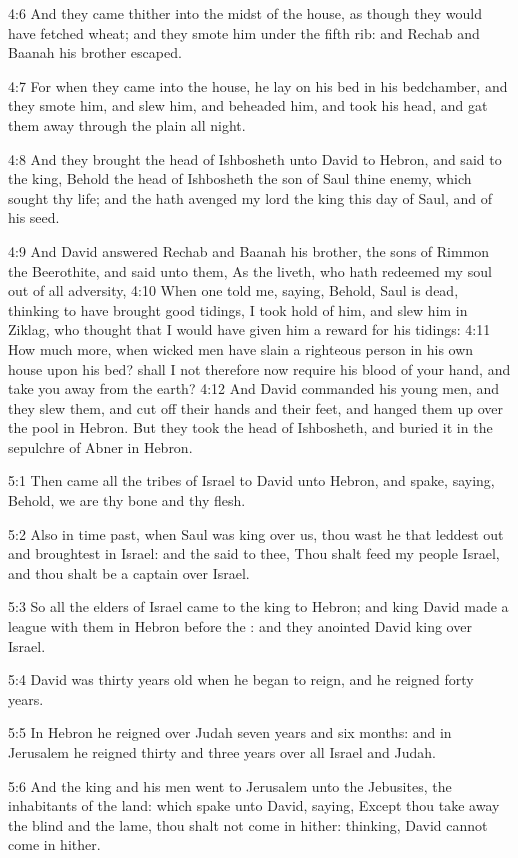 4:6 And they came thither into the midst of the house, as though they would have fetched wheat; and they smote him under the fifth rib: and Rechab and Baanah his brother escaped.

4:7 For when they came into the house, he lay on his bed in his bedchamber, and they smote him, and slew him, and beheaded him, and took his head, and gat them away through the plain all night.

4:8 And they brought the head of Ishbosheth unto David to Hebron, and said to the king, Behold the head of Ishbosheth the son of Saul thine enemy, which sought thy life; and the \LORD hath avenged my lord the king this day of Saul, and of his seed.

4:9 And David answered Rechab and Baanah his brother, the sons of Rimmon the Beerothite, and said unto them, As the \LORD liveth, who hath redeemed my soul out of all adversity, 4:10 When one told me, saying, Behold, Saul is dead, thinking to have brought good tidings, I took hold of him, and slew him in Ziklag, who thought that I would have given him a reward for his tidings: 4:11 How much more, when wicked men have slain a righteous person in his own house upon his bed? shall I not therefore now require his blood of your hand, and take you away from the earth?  4:12 And David commanded his young men, and they slew them, and cut off their hands and their feet, and hanged them up over the pool in Hebron. But they took the head of Ishbosheth, and buried it in the sepulchre of Abner in Hebron.

5:1 Then came all the tribes of Israel to David unto Hebron, and spake, saying, Behold, we are thy bone and thy flesh.

5:2 Also in time past, when Saul was king over us, thou wast he that leddest out and broughtest in Israel: and the \LORD said to thee, Thou shalt feed my people Israel, and thou shalt be a captain over Israel.

5:3 So all the elders of Israel came to the king to Hebron; and king David made a league with them in Hebron before the \LORD: and they anointed David king over Israel.

5:4 David was thirty years old when he began to reign, and he reigned forty years.

5:5 In Hebron he reigned over Judah seven years and six months: and in Jerusalem he reigned thirty and three years over all Israel and Judah.

5:6 And the king and his men went to Jerusalem unto the Jebusites, the inhabitants of the land: which spake unto David, saying, Except thou take away the blind and the lame, thou shalt not come in hither: thinking, David cannot come in hither.

